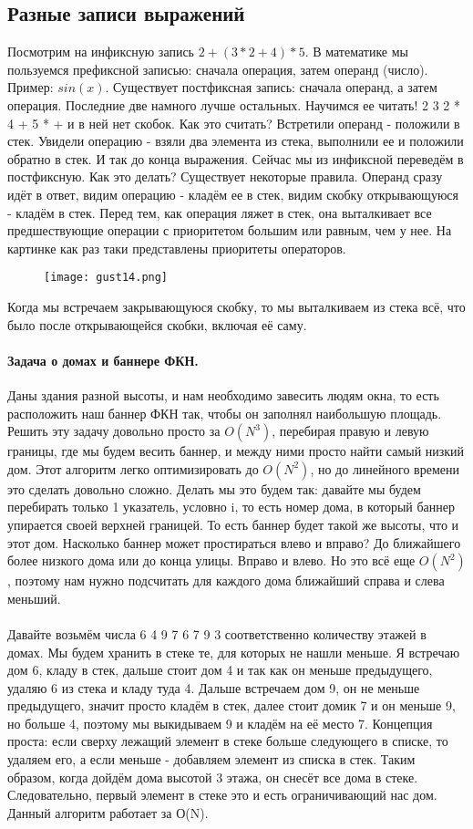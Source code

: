 \documentclass[a4paper,12pt]{article}
\begin{document}
\subsection{Разные записи выражений}
Посмотрим на инфиксную запись $2+(3*2+4)*5$. В математике мы пользуемся префиксной записью: сначала операция, затем операнд (число). Пример: $sin(x)$. Существует постфиксная запись: сначала операнд, а затем операция. Последние две намного лучше остальных. Научимся ее читать! 2 3 2 * 4 + 5 * + и в ней нет скобок. Как это считать? Встретили операнд - положили в стек. Увидели операцию - взяли два элемента из стека, выполнили ее и положили обратно в стек. И так до конца выражения. Сейчас мы из инфиксной переведём в постфиксную. Как это делать? Существует некоторые правила. Операнд сразу идёт в ответ, видим операцию - кладём ее в стек, видим скобку открывающуюся - кладём в стек. Перед тем, как операция ляжет в стек, она выталкивает все предшествующие операции с приоритетом большим или равным, чем у нее. На картинке как раз таки представлены приоритеты операторов.
\begin{figure}[h]
\centering
\texttt{[image: gust14.png]}
\end{figure}
Когда мы встречаем закрывающуюся скобку, то мы выталкиваем из стека всё, что было после открывающейся скобки, включая её саму. 
\paragraph{Задача о домах и баннере ФКН.}
Даны здания разной высоты, и нам необходимо завесить людям окна, то есть расположить наш баннер ФКН так, чтобы он заполнял наибольшую площадь. Решить эту задачу довольно просто за $O(N^3)$, перебирая правую и левую границы, где мы будем весить баннер, и между ними просто найти самый низкий дом. Этот алгоритм легко оптимизировать до $O(N^2)$, но до линейного времени это сделать довольно сложно. Делать мы это будем так: давайте мы будем перебирать только 1 указатель, условно i, то есть номер дома, в который баннер упирается своей верхней границей. То есть баннер будет такой же высоты, что и этот дом. Насколько баннер может простираться влево и вправо? До ближайшего более низкого дома или до конца улицы. Вправо и влево. Но это всё еще $O(N^2)$, поэтому нам нужно подсчитать для каждого дома ближайший справа и слева меньший. \\
\\
Давайте возьмём числа 6 4 9 7 6 7 9 3 соответственно количеству этажей в домах. Мы будем хранить в стеке те, для которых не нашли меньше. Я встречаю дом 6, кладу в стек, дальше стоит дом 4 и так как он меньше предыдущего, удаляю 6 из стека и кладу туда 4. Дальше встречаем дом 9, он не меньше предыдущего, значит просто кладём в стек, далее стоит домик 7 и он меньше 9, но больше 4, поэтому мы выкидываем 9 и кладём на её место 7. Концепция проста: если сверху лежащий элемент в стеке больше следующего в списке, то удаляем его, а если меньше - добавляем элемент из списка в стек. Таким образом, когда дойдём дома высотой 3 этажа, он снесёт все дома в стеке. Следовательно, первый элемент в стеке это и есть ограничивающий нас дом. Данный алгоритм работает за О(N).
\end{document}
